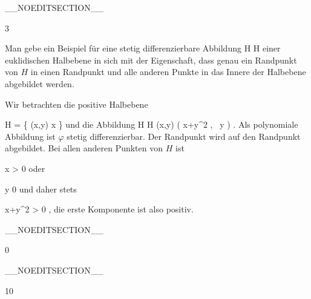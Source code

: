 __NOEDITSECTION__

{3}

{

Man gebe ein Beispiel für eine stetig differenzierbare Abbildung
\maabbdisp {\varphi} { H } { H
} {}
einer euklidischen Halbebene in sich mit der Eigenschaft, dass genau ein Randpunkt von $H$ in einen Randpunkt und alle anderen Punkte in das Innere der Halbebene abgebildet werden.

}
{

Wir betrachten die positive Halbebene

\mavergleichskettedisp
{\vergleichskette
{ H
}
{ =} { \left\{ (x,y)  \mid   x         \right\}
}
{ } {
}
{ } {
}
{ } {
}
}
{}{}{}
und die Abbildung
\maabbeledisp {\varphi} { H } {H
} {(x,y)} { \left(  x+y^2  , \,   y                   \right)
} {.}
Als polynomiale Abbildung ist $\varphi$ stetig differenzierbar. Der Randpunkt
 wird auf den Randpunkt
 abgebildet. Bei allen anderen Punkten von $H$ ist

\mavergleichskette
{\vergleichskette
{ x
}
{ > }{  0
}
{  }{
}
{    }{
}
{   }{
}
}
{}{}{}
oder

\mavergleichskette
{\vergleichskette
{ y
}
{ \neq }{ 0
}
{  }{
}
{    }{
}
{   }{
}
}
{}{}{}
und daher stets

\mavergleichskettedisp
{\vergleichskette
{ x+y^2
}
{ >} {  0
}
{ } {
}
{ } {
}
{ } {
}
}
{}{}{,}
die erste Komponente ist also positiv.

 }

__NOEDITSECTION__

{0}

{

}
{  }

__NOEDITSECTION__

{10}

